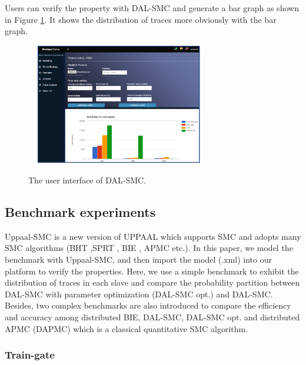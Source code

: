 Users can verify the property with DAL-SMC and generate a bar graph as shown in Figure \ref{ui_dsmc}. It shows the distribution of traces more obviously with the bar graph.
\begin{figure}[htbp]
	\centering
	{\includegraphics[width=3.2in,height=2.1in]{fig/system.png}}
	\caption{The user interface of DAL-SMC.}\label{ui_dsmc}
\end{figure}

\subsection{Benchmark experiments}
Uppaal-SMC \cite{Bulychev2012UPPAAL} is a new version of UPPAAL which supports SMC and adopts many SMC algorithms (BHT \cite{jha2009bayesian},SPRT \cite{younes2006statistical}, BIE \cite{zuliani2013bayesian}, APMC \cite{herault2004approximate} etc.). In this paper, we model the benchmark with Uppaal-SMC, and then import the model (.xml) into our platform to verify the properties. Here, we use a simple benchmark to exhibit the distribution of traces in each slave and compare the probability partition between DAL-SMC with parameter optimization (DAL-SMC opt.) and DAL-SMC. Besides, two complex benchmarks are also introduced to compare the efficiency and accuracy among distributed BIE, DAL-SMC, DAL-SMC opt. and distributed APMC (DAPMC) which is a classical quantitative SMC algorithm.

\subsubsection{Train-gate}

